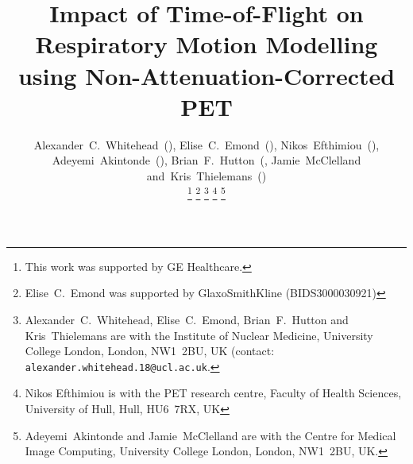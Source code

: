 \documentclass[journal]{IEEEtran}
\begin{document}
%
\title{Impact of Time-of-Flight on Respiratory Motion Modelling using Non-Attenuation-Corrected PET}
%
%
%

\author{Alexander~C.~Whitehead~(),
        Elise~C.~Emond~(),
        Nikos~Efthimiou~(),
        Adeyemi~Akintonde~(),
        Brian~F.~Hutton~(,
        Jamie~McClelland
        and~Kris~Thielemans~()%

    \thanks{This work was supported by GE Healthcare.}%
    \thanks{Elise~C.~Emond was supported by GlaxoSmithKline (BIDS3000030921)}
    \thanks{Alexander~C.~Whitehead, Elise~C.~Emond, Brian~F.~Hutton and Kris~Thielemans are with the Institute of Nuclear Medicine, University College London, London, NW1~2BU, UK (contact: \texttt{alexander.whitehead.18@ucl.ac.uk}.}%
    \thanks{Nikos Efthimiou is with the PET research centre, Faculty of Health Sciences, University of Hull, Hull, HU6~7RX, UK}%
    \thanks{Adeyemi~Akintonde and Jamie~McClelland are with the Centre for Medical Image Computing, University College London, London, NW1~2BU, UK.}%
}

% 
%
\end{document}
